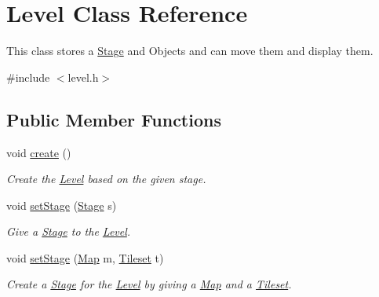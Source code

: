 \hypertarget{classLevel}{}\section{Level Class Reference}
\label{classLevel}


This class stores a \hyperlink{classStage}{Stage} and Objects and can move them and display them.  




{\ttfamily \#include $<$level.\+h$>$}

\subsection*{Public Member Functions}
\begin{DoxyCompactItemize}
\item 
\mbox{\label{classLevel_a81689e48aaf6d5421721bd06f480e4e1}} 
void \hyperlink{classLevel_a81689e48aaf6d5421721bd06f480e4e1}{create} ()
\begin{DoxyCompactList}\small\item\em Create the \hyperlink{classLevel}{Level} based on the given stage. \end{DoxyCompactList}\item 
\mbox{\label{classLevel_ac9bb5473dece11462e702fe418590f24}} 
void \hyperlink{classLevel_ac9bb5473dece11462e702fe418590f24}{set\+Stage} (\hyperlink{classStage}{Stage} s)
\begin{DoxyCompactList}\small\item\em Give a \hyperlink{classStage}{Stage} to the \hyperlink{classLevel}{Level}. \end{DoxyCompactList}\item 
\mbox{\label{classLevel_a962fd10cb871d2fdd98230dc079bff34}} 
void \hyperlink{classLevel_a962fd10cb871d2fdd98230dc079bff34}{set\+Stage} (\hyperlink{classMap}{Map} m, \hyperlink{classTileset}{Tileset} t)
\begin{DoxyCompactList}\small\item\em Create a \hyperlink{classStage}{Stage} for the \hyperlink{classLevel}{Level} by giving a \hyperlink{classMap}{Map} and a \hyperlink{classTileset}{Tileset}. \end{DoxyCompactList}\item 
\mbox{\label{classLevel_a3fcaa774a00e39090336b5a61d88e3e2}} 

\end{DoxyCompactItemize}

